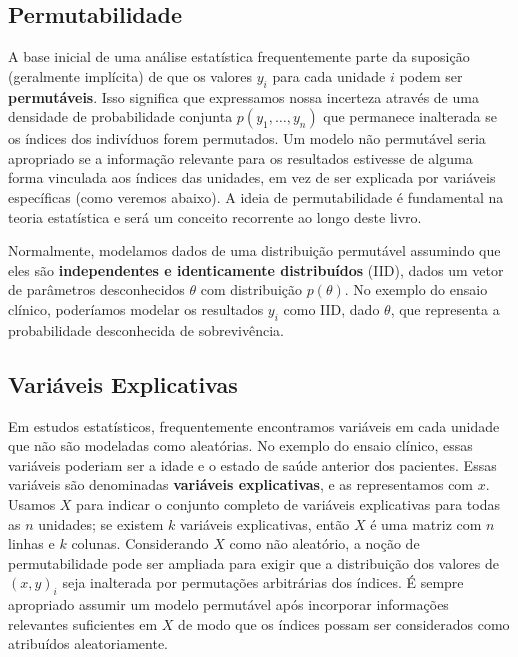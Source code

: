 \subsection{Permutabilidade}

A base inicial de uma análise estatística frequentemente parte da suposição (geralmente implícita) de que os valores $ y_i $ para cada unidade $ i $ podem ser \textbf{permutáveis}. Isso significa que expressamos nossa incerteza através de uma densidade de probabilidade conjunta $ p(y_1, \ldots, y_n) $ que permanece inalterada se os índices dos indivíduos forem permutados. Um modelo não permutável seria apropriado se a informação relevante para os resultados estivesse de alguma forma vinculada aos índices das unidades, em vez de ser explicada por variáveis específicas (como veremos abaixo). A ideia de permutabilidade é fundamental na teoria estatística e será um conceito recorrente ao longo deste livro.

Normalmente, modelamos dados de uma distribuição permutável assumindo que eles são \textbf{independentes e identicamente distribuídos} (IID), dados um vetor de parâmetros desconhecidos $ \theta $ com distribuição $ p(\theta) $. No exemplo do ensaio clínico, poderíamos modelar os resultados $ y_i $ como IID, dado $ \theta $, que representa a probabilidade desconhecida de sobrevivência.

\subsection{Variáveis Explicativas}

Em estudos estatísticos, frequentemente encontramos variáveis em cada unidade que não são modeladas como aleatórias. No exemplo do ensaio clínico, essas variáveis poderiam ser a idade e o estado de saúde anterior dos pacientes. Essas variáveis são denominadas \textbf{variáveis explicativas}, e as representamos com $ x $. Usamos $ X $ para indicar o conjunto completo de variáveis explicativas para todas as $ n $ unidades; se existem $ k $ variáveis explicativas, então $ X $ é uma matriz com $ n $ linhas e $ k $ colunas. Considerando $ X $ como não aleatório, a noção de permutabilidade pode ser ampliada para exigir que a distribuição dos valores de $ (x, y)_i $ seja inalterada por permutações arbitrárias dos índices.  É sempre apropriado assumir um modelo permutável após incorporar informações relevantes suficientes em $X$
de modo que os índices possam ser considerados como atribuídos aleatoriamente.


